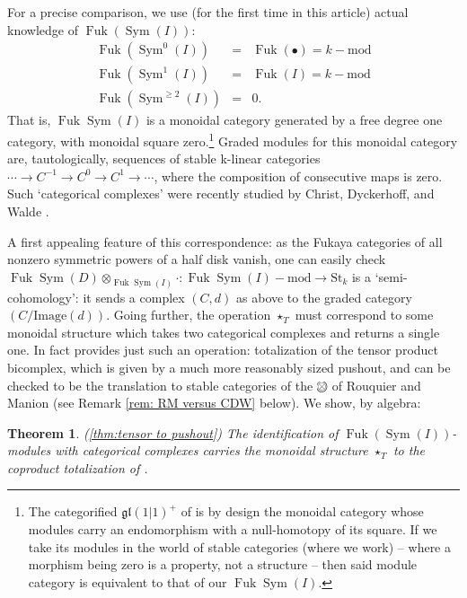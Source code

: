 \documentclass{article}
\DeclareMathOperator{\Sym}{Sym}
\DeclareMathOperator{\Fuk}{Fuk}
\newcommand{\ootimes}{
\ooalign{$\otimes$\cr\hidewidth$\bigcirc$\hidewidth}}
\newtheorem{theorem}{Theorem}[section]
\theoremstyle{definition}
\begin{document}
    For a precise comparison, we use (for the first time in this article) actual knowledge of  $\Fuk(\Sym(I))$: 
    \begin{eqnarray*}
        \Fuk(\Sym^0(I)) & = & \Fuk(\bullet) = k-\mathrm{mod} \\
        \Fuk(\Sym^1(I)) & = & \Fuk(I) = k-\mathrm{mod} \\
        \Fuk(\Sym^{\ge 2}(I)) & = & 0.
    \end{eqnarray*}
    That is, $\Fuk\Sym(I)$ is a  monoidal category generated by a free degree one category, with monoidal square zero.\footnote{The categorified $\mathfrak{gl}(1|1)^+$ of  \cite{khovanov-gl12,
    rouquier-manion} is by design the monoidal category whose modules carry an endomorphism with a null-homotopy of its square.  If we take its modules in the world of stable categories (where we work) -- where a morphism being zero is a property, not a structure -- then said module category is equivalent to that of our $\Fuk\Sym(I)$.} %
    Graded modules for this monoidal category are, tautologically, sequences of stable k-linear categories $\cdots \to C^{-1} \to C^0 \to C^1 \to \cdots$, where the composition of consecutive maps is zero.  
    Such  `categorical complexes' were recently studied by Christ, Dyckerhoff, and Walde \cite{Christ-Dyckerhoff-Walde}.
    
    A first appealing feature of this correspondence:  as the Fukaya categories of all nonzero symmetric powers of a half disk vanish, one can easily check  
     $\Fuk\Sym(D) \otimes_{\Fuk\Sym(I)} \cdot : \Fuk\Sym(I)-\mathrm{mod} \to \mathrm{St}_k$ is a `semi-cohomology': it sends 
    a complex $(C,d)$ as above to the graded category $(C / \mathrm{Image}(d))$.  
    Going further, the operation  $\star_T$ must correspond to some monoidal structure which takes two categorical complexes and returns a single one.     
    In fact \cite{Christ-Dyckerhoff-Walde} provides just such an operation: totalization of the tensor product bicomplex, which is given by a much more reasonably sized pushout, and can be checked to be the translation to stable categories of the  $\ootimes$ of Rouquier and Manion (see Remark \ref{rem: RM versus CDW} below).
    We show, by algebra:  

    \begin{theorem} \label{thm:cdw} (\ref{thm:tensor to pushout})
        The identification of $\Fuk(\Sym(I))$-modules with categorical complexes carries the monoidal structure $\star_T$ to the coproduct totalization of \cite{Christ-Dyckerhoff-Walde}.  
    \end{theorem}
\end{document}
